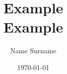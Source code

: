 \documentclass{unibooklet}
\title{%
\vskip 2cm
Example\\
{\large Example}}
\author{Name Surname}
\date{\today}
\begin{document}
    \makeTitlePage
    \pagebreak

    
\end{document}
